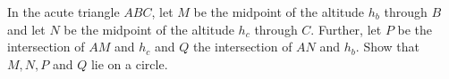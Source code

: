 In the acute triangle $ABC$, let $M$ be the midpoint of the altitude $h_b$ through $B$ and
let $N$ be the midpoint of the altitude $h_c$ through $C$.
Further, let $P$ be the intersection of $AM$ and $h_c$ and $Q$ the intersection of $AN$ and $h_b$.
Show that $M, N, P$ and $Q$ lie on a circle.